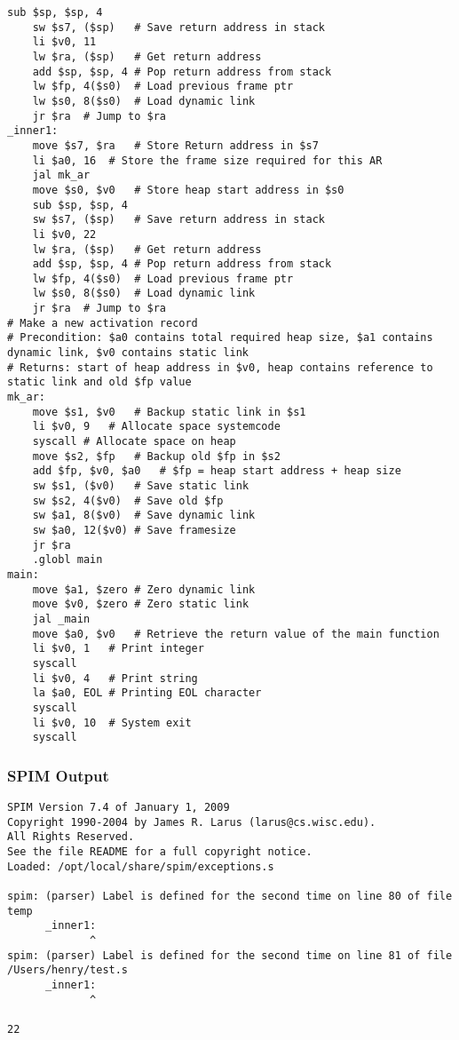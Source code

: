 \begin{lstlisting}[showstringspaces=false,breaklines=true,backgroundcolor=\color{light-gray}, captionpos=b]
	sub $sp, $sp, 4
	sw $s7, ($sp)	# Save return address in stack
	li $v0, 11
	lw $ra, ($sp)	# Get return address
	add $sp, $sp, 4	# Pop return address from stack
	lw $fp, 4($s0)	# Load previous frame ptr
	lw $s0, 8($s0)	# Load dynamic link
	jr $ra	# Jump to $ra
_inner1:
	move $s7, $ra	# Store Return address in $s7
	li $a0, 16	# Store the frame size required for this AR
	jal mk_ar
	move $s0, $v0	# Store heap start address in $s0
	sub $sp, $sp, 4
	sw $s7, ($sp)	# Save return address in stack
	li $v0, 22
	lw $ra, ($sp)	# Get return address
	add $sp, $sp, 4	# Pop return address from stack
	lw $fp, 4($s0)	# Load previous frame ptr
	lw $s0, 8($s0)	# Load dynamic link
	jr $ra	# Jump to $ra
# Make a new activation record
# Precondition: $a0 contains total required heap size, $a1 contains dynamic link, $v0 contains static link
# Returns: start of heap address in $v0, heap contains reference to static link and old $fp value
mk_ar:
	move $s1, $v0	# Backup static link in $s1
	li $v0, 9	# Allocate space systemcode
	syscall	# Allocate space on heap
	move $s2, $fp	# Backup old $fp in $s2
	add $fp, $v0, $a0	# $fp = heap start address + heap size
	sw $s1, ($v0)	# Save static link
	sw $s2, 4($v0)	# Save old $fp
	sw $a1, 8($v0)	# Save dynamic link
	sw $a0, 12($v0)	# Save framesize
	jr $ra
	.globl main
main:
	move $a1, $zero	# Zero dynamic link
	move $v0, $zero	# Zero static link
	jal _main
	move $a0, $v0	# Retrieve the return value of the main function
	li $v0, 1	# Print integer
	syscall
	li $v0, 4	# Print string
	la $a0, EOL	# Printing EOL character
	syscall
	li $v0, 10	# System exit
	syscall

\end{lstlisting}\subsubsection{SPIM Output}
\begin{verbatim}
SPIM Version 7.4 of January 1, 2009
Copyright 1990-2004 by James R. Larus (larus@cs.wisc.edu).
All Rights Reserved.
See the file README for a full copyright notice.
Loaded: /opt/local/share/spim/exceptions.s

spim: (parser) Label is defined for the second time on line 80 of file temp
	  _inner1:
	         ^
spim: (parser) Label is defined for the second time on line 81 of file /Users/henry/test.s
	  _inner1:
	         ^

22
\end{verbatim}
